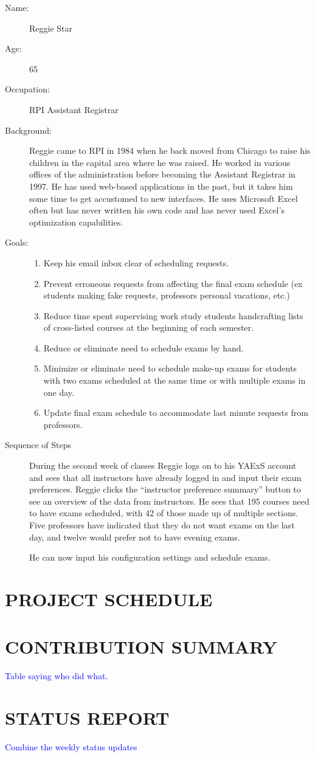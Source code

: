 \documentclass[11pt]{article}
\begin{document}
\begin{description}
\item[Name:] Reggie Star
\item[Age:]  65
\item[Occupation:] RPI Assistant Registrar
\item[Background:] Reggie came to RPI in 1984 when he  back moved from Chicago to raise his children in the capital area where he was raised. 
He worked in various offices of the administration before becoming the Assistant Registrar in 1997. 
He has used web-based applications in the past, but it takes him some time to get accustomed to new interfaces. 
He uses Microsoft Excel often but has never written his own code and has never used Excel’s optimization capabilities.

\item[Goals:]
\begin{enumerate}
\item Keep his email inbox clear of scheduling requests.
\item Prevent erroneous requests from affecting the final exam schedule (ex students making fake requests, professors personal vacations, etc.)
\item Reduce time spent supervising work study students handcrafting lists of cross-listed courses at the beginning of each semester.
\item Reduce or eliminate need to schedule exams by hand.
\item Minimize or eliminate need to schedule make-up exams for students with two exams scheduled at the same time or with multiple exams in one day.
\item Update final exam schedule to accommodate last minute requests from professors.
\end{enumerate}

\item[Sequence of Steps]
During the second week of classes Reggie logs on to his YAExS account and sees that all instructors have already logged in and input their exam preferences.  
Reggie clicks the “instructor preference summary” button to see an overview of the data from instructors. He sees that 195 courses need to have exams scheduled, with 42 of those made up of multiple sections. Five professors have indicated that they do not want exams on the last day, and twelve would prefer not to have evening exams.

He can now input his configuration settings and schedule exams. 



\end{description}



\section{PROJECT SCHEDULE} %

\section{CONTRIBUTION SUMMARY} %
\textcolor{blue}{Table saying who did what.}

\section{STATUS REPORT} %
\textcolor{blue}{Combine the weekly status updates}
\end{document}
